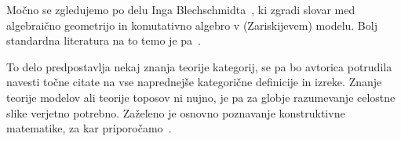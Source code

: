


Močno se zgledujemo po delu Inga
Blechschmidta~\cite{Blechschmidt17,Blechschmidt22}, ki zgradi slovar med
algebraično geometrijo in komutativno algebro v (Zariskijevem) modelu. Bolj
standardna literatura na to temo je pa~\cite{MM92,Johnstone02}.

To delo predpostavlja nekaj znanja teorije kategorij, se pa bo avtorica
potrudila navesti točne citate na vse naprednejše kategorične definicije in
izreke. Znanje teorije modelov ali teorije toposov ni nujno, je pa za globje
razumevanje celostne slike verjetno potrebno. Zaželeno je osnovno poznavanje
konstruktivne matematike, za kar priporočamo~\cite{Bauer16, Bishop85}.

